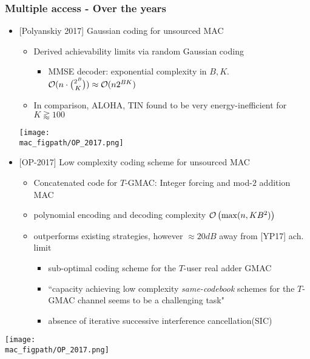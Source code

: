 \begin{frame} \frametitle{Multiple access - Over the years}
	\begin{itemize} 
	\item {[Polyanskiy 2017]} Gaussian coding for unsourced MAC 
	\vspace{3pt}
	\begin{itemize}	\setlength{\itemsep}{4pt}
		\item Derived achievability limits via random Gaussian coding 
			\begin{itemize}
				\item MMSE decoder: {\color{red} exponential complexity} in $B,K$. $\mathcal{O}(n\cdot\binom{2^B}{K})\approx\mathcal{O}(n2^{BK})$
			\end{itemize}
			\item In comparison, ALOHA, TIN found to be very energy-inefficient for $K\gtrapprox100$
	\end{itemize}
	\pause 
		\centering
		\texttt{[image: \\mac\_figpath/OP\_2017.png]}
\end{itemize}
\end{frame}

\begin{frame}
\begin{itemize}
	\item {[OP-2017]} Low complexity coding scheme for unsourced MAC
	\begin{itemize}\setlength{\itemsep}{4pt}
		\item Concatenated code for $T$-GMAC: Integer forcing and mod-$2$ addition MAC 
		\item {\color{blue} polynomial} encoding and decoding complexity $\mathcal{O}\left(\max(n, KB^2)\right)$
		\item {\color{blue} outperforms} existing strategies, however {\color{red} $\approx 20dB$ away} from [YP17] ach. limit
		\pause
		\begin{itemize}	\setlength{\itemsep}{2pt}
		\item sub-optimal coding scheme for the $T$-user real adder GMAC
		\item ``capacity achieving low complexity \emph{same-codebook} schemes for the $T$-GMAC channel seems to be a challenging task"
		\item absence of iterative successive interference cancellation(SIC)
		\end{itemize}
	\end{itemize}
\end{itemize}
	\centering
\texttt{[image: \\mac\_figpath/OP\_2017.png]}	
\end{frame}

